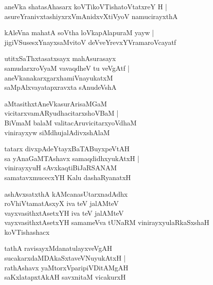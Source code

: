 \begin{shloka}
aneVka shatasAhasarx koVTikoVTishatoVtatxreY H |\\ asureYranivxtashiyxrxVmAnidxvXtiVyoV namucirayxthA
\end{shloka}

\begin{shloka}
kAleVna mahatA soVtha loVkapAlapuraM yayw |\\ jigiVSusesxYnayxsaMvitoV deVveYrevxYVramaroVcayatf
\end{shloka}

\begin{shloka}
utitxSaThxtasatxsayx mahAsurasayx\\ samudarxroVyaM vavaqdheV tu veVgAtf |\\ aneVkanakarxgarxhamiVnayukatxM\\ saMpAlxvayatapxravxta sAnudeVshA\R
\end{shloka}

\begin{shloka}
aMtasithxtAneVkasurArisaMGaM \\ vicitarxvamARyudhacitarxshoVBaM |\\ BiVmaM balaM valitacAruvicitarxyoVdhaM \\ vinirayxyw siMdhujalAdivxshAlaM
\end{shloka}

\begin{shloka}
tatarx divxpAdeYtayxBaTABuyxpeVtAH \\ sa yAnaGaMTAshavx samaqdidhxyukAtxH |\\ vinirayxyuH sAvxkaqtiBiJaRSANAM \\ samatavxmucecxYH Kalu dashaRyanatxH
\end{shloka}

\begin{shloka}
ashAvxsatxthA kAMcanasUtarxnadAdhx\\ roVhiVtamatAsxyX iva teV jalAMteV\\ vayxvasithxtAsetxYH iva teV jalAMteV \\ vayxvasithxtAsetxYH samameVva tUNaRM vinirayxyulaRkaSxshaH koVTishashacx
\end{shloka}

\begin{shloka}
tathA ravisayxMdanatulayxveVgAH \\ sucakarxdaMDAkaSxtaveVNuyukAtxH |\\ rathAshavx yaMtorxVparipiVDitAMgAH\\saKxlatapxtAkAH savxnitaM vicakurxH
\end{shloka}

